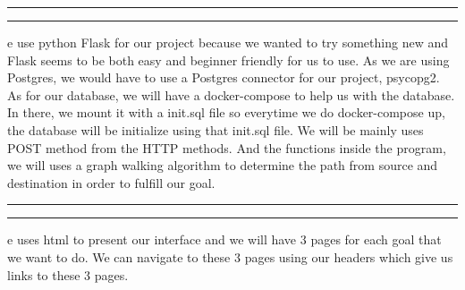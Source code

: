 \documentclass[a4paper, 11pt]{article}
\newcommand{\question}[2] {\vspace{.25in} \hrule\vspace{0.5em}
\noindent{\bf #1: #2} \vspace{0.5em}
\hrule \vspace{.10in}}
\begin{document}

\question{Backend}

We use python Flask for our project because we wanted to try something new and Flask seems to be both easy and beginner friendly for us to use. As we are using Postgres, we would have to use a Postgres connector for our project, psycopg2. As for our database, we will have a docker-compose to help us with the database. In there, we mount it with a init.sql file so everytime we do docker-compose up, the database will be initialize using that init.sql file. We will be mainly uses POST method from the HTTP methods. And the functions inside the program, we will uses a graph walking algorithm to determine the path from source and destination in order to fulfill our goal.

\question{Frontend}

We uses html to present our interface and we will have 3 pages for each goal that we want to do. We can navigate to these 3 pages using our headers which give us links to these 3 pages.
\end{document}
